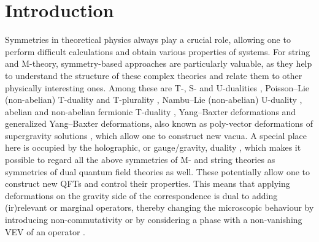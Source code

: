 \documentclass[12pt, utf8]{article}
\numberwithin{equation}{section}
\begin{document}
\tableofcontents

\setcounter{page}{2}


\newpage


\section{Introduction}

Symmetries in theoretical physics always play a crucial role, allowing one to perform difficult calculations and obtain various properties of systems. For string and M-theory, symmetry-based approaches are particularly valuable, as they help to understand the structure of these complex theories and relate them to other physically interesting ones. Among these are T-, S- and U-dualities \cite{PhysRevLett.58.1597,MONTONEN1977117,Cremmer:1997ct,Cremmer:1998px,HULL1995109}, Poisson–Lie (non-abelian) T-duality and T-plurality \cite{Klimcik:1995jn,CtiradKlimcík_2002,KLIMCIK1995455,VonUnge:2002xjf}, Nambu–Lie (non-abelian) U-duality \cite{10.1093/ptep/ptz172,Malek:2019xrf,Sakatani:2020wah,Malek:2020hpo,PhysRevD.104.046015,Musaev:2020bwm}, abelian and non-abelian fermionic T-duality \cite{Berkovits:2008ic,Bakhmatov:2011ab,NIKOLIC2017105,Astrakhantsev:2021rhj,Astrakhantsev:2022mfs,Osten:2016dvf}, Yang–Baxter deformations \cite{Bena:2003wd,Klimcik:2002zj,Klimcik:2008eq} and generalized Yang–Baxter deformations, also known as poly-vector deformations  of supergravity solutions \cite{Ashmore:2018npi,Lunin:2005jy,Bakhmatov:2019dow,Bakhmatov:2020kul,Gubarev:2020ydf,Bakhmatov:2017joy,Bakhmatov:2018apn,Bakhmatov:2018bvp,Barakin:2024rnz,Gubarev:2024tks,Gubarev:2025hvr,Gubarev:2025qox}, which allow one to construct new vacua. A special place here is occupied by the holographic, or gauge/gravity, duality \cite{Maldacena:1997re,Horowitz:2006ct}, which makes it possible to regard all the above symmetries of M- and string theories as symmetries of dual quantum field theories as well. These potentially allow one to construct new QFTs and control their properties. This means that applying deformations on the gravity side of the correspondence is dual to adding (ir)relevant or marginal operators, thereby changing the microscopic behaviour by introducing non-commutativity or by considering a phase with a non-vanishing VEV of an operator \cite{Leigh:1995ep,Argyres:1995jj,Lunin:2005jy,vanTongeren:2015uha,Imeroni:2008cr}.
\end{document}
